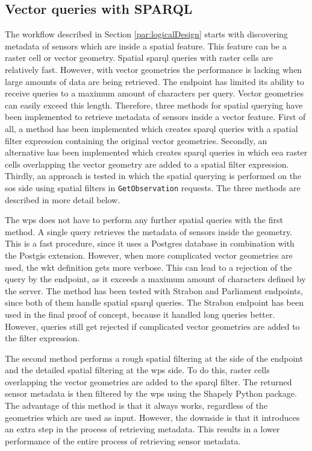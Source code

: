 \subsection{Vector queries with SPARQL}
The workflow described in Section \ref{par:logicalDesign} starts with discovering metadata of sensors which are inside a spatial feature. This feature can be a raster cell or vector geometry. Spatial \ac{sparql} queries with raster cells are relatively fast. However, with vector geometries the performance is lacking when large amounts of data are being retrieved. The endpoint has limited its ability to receive queries to a maximum amount of characters per query. Vector geometries can easily exceed this length. Therefore, three methods for spatial querying have been implemented to retrieve metadata of sensors inside a vector feature. First of all, a method has been implemented which creates \ac{sparql} queries with a spatial filter expression containing the original vector geometries. Secondly, an alternative has been implemented which creates \ac{sparql} queries in which \ac{eea} raster cells overlapping the vector geometry are added to a spatial filter expression. Thirdly, an approach is tested in which the spatial querying is performed on the \ac{sos} side using spatial filters in \texttt{GetObservation} requests. The three methods are described in more detail below.

The \ac{wps} does not have to perform any further spatial queries with the first method. A single query retrieves the metadata of sensors inside the geometry. This is a fast procedure, since it uses a Postgres database in combination with the Postgis extension. However, when more complicated vector geometries are used, the \ac{wkt} definition gets more verbose. This can lead to a rejection of the query by the endpoint, as it exceeds a maximum amount of characters defined by the server. The method has been tested with Strabon and Parliament endpoints, since both of them handle spatial \ac{sparql} queries. The Strabon endpoint has been used in the final proof of concept, because it handled long queries better. However, queries still get rejected if complicated vector geometries are added to the filter expression.    

The second method performs a rough spatial filtering at the side of the endpoint and the detailed spatial filtering at the \ac{wps} side. To do this, raster cells overlapping the vector geometries are added to the \ac{sparql} filter. The returned sensor metadata is then filtered by the \ac{wps} using the Shapely Python package. The advantage of this method is that it always works, regardless of the geometries which are used as input. However, the downside is that it introduces an extra step in the process of retrieving metadata. This results in a lower performance of the entire process of retrieving sensor metadata.  

